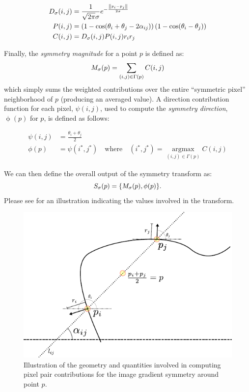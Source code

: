 \begin{align}
D_\sigma(i,j) &= \frac{1}{\sqrt{2\pi}\sigma}e^{-\frac{\left\lVert p_i - p_j \right\rVert}{2\sigma}} \label{eq:dist} \\
P(i,j)        &= \left(1 - \cos(\theta_i + \theta_j - 2\alpha_{ij})\right)\left(1 - \cos(\theta_i - \theta_j)\right) \label{eq:phase}\\
C(i,j)        &= D_\sigma(i,j)P(i,j)r_i r_j \label{eq:cont}
\end{align}

Finally, the \emph{symmetry magnitude} for a point \(p\) is defined as:
\[ M_\sigma(p) = \sum_{(i,j) \in \Gamma(p)} C(i,j) \] which simply sums the weighted contributions over the entire ``symmetric pixel'' neighborhood of \(p\) (producing an averaged value). A direction contribution function for each pixel, \(\psi(i,j)\), used to compute the \emph{symmetry direction}, \(\operatorname{\phi}(p)\) for \(p\), is defined as follows:

\begin{align}
\psi(i,j) &= \frac{\theta_i + \theta_j}{2} \\
\phi(p)   &= \psi(i^*,j^*)\quad\mathrm{where}\quad(i^*,j^*) = \operatorname*{argmax}_{(i,j) \in \Gamma(p)} C(i,j)
\end{align} 

We can then define the overall output of the symmetry transform as:
\[S_\sigma(p) = \{M_\sigma(p), \phi(p)\}.\] Please see  for an illustration indicating the values involved in the transform.

\Needspace{0.3\textheight}
\begin{figure}[ht]
\centering
\includegraphics[width=0.6\linewidth]{figures/pixel_contributions.pdf}
\caption[Illustration of the geometry and quantities involved in computing pixel pair contributions.]{\label{fig:pixel-contr}
Illustration of the geometry and quantities involved in computing pixel pair contributions for the image gradient symmetry around point \(p\).}
\end{figure}

